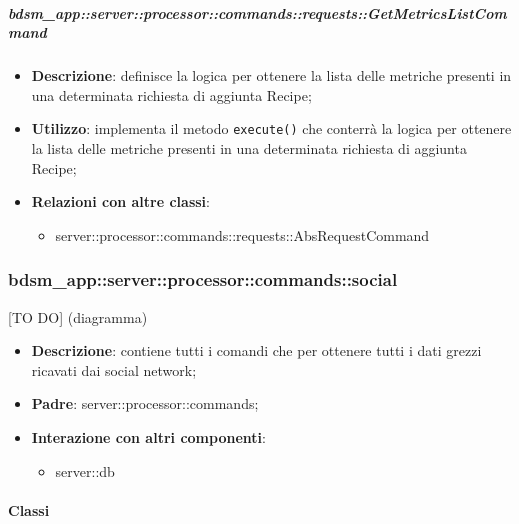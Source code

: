         \subparagraph{bdsm\_app::server::processor::commands::requests::GetMetricsListCommand} %
        \label{subp:bdsm_app_server_processor_commands_requests_getmetricslistcommand}
        \begin{itemize}
          \item \textbf{Descrizione}: definisce la logica per ottenere la lista delle metriche presenti in una determinata richiesta di aggiunta Recipe;
          \item \textbf{Utilizzo}: implementa il metodo \texttt{execute()} che conterrà la logica per ottenere la lista delle metriche presenti in una determinata richiesta di aggiunta Recipe;
          \item \textbf{Relazioni con altre classi}:
            \begin{itemize}
              \item server::processor::commands::requests::AbsRequestCommand
            \end{itemize}
        \end{itemize}

      \subsubsection{bdsm\_app::server::processor::commands::social} %
      \label{ssub:bdsm_app_server_processor_commands_social}
      [TO DO] (diagramma) \newline \newline

      \begin{itemize}
        \item \textbf{Descrizione}: contiene tutti i comandi che per ottenere tutti i dati grezzi ricavati dai social network;
        \item \textbf{Padre}: server::processor::commands;
        \item \textbf{Interazione con altri componenti}:
          \begin{itemize}
            \item server::db
          \end{itemize}
      \end{itemize}

        \paragraph{Classi} %

